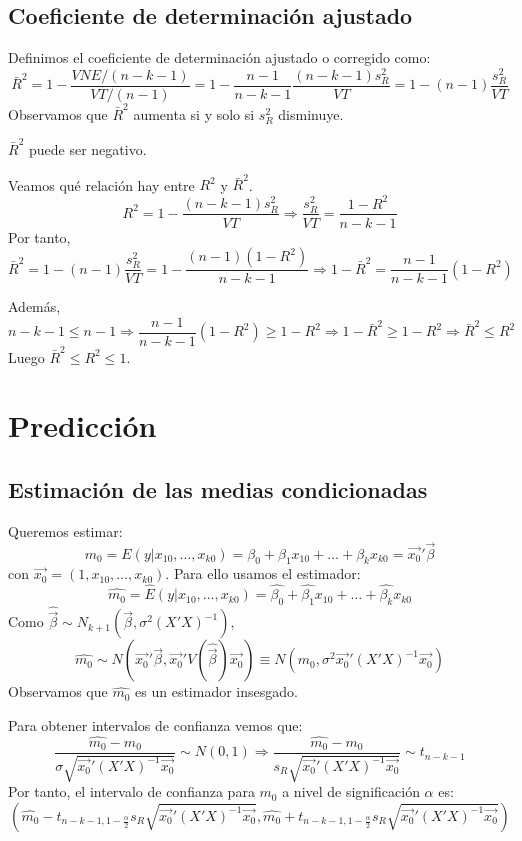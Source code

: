 \subsection*{Coeficiente de determinación ajustado}
Definimos el coeficiente de determinación ajustado o corregido como:
$$\bar{R}^2 = 1 - \frac{VNE/(n-k-1)}{VT/(n-1)} = 1 - \frac{n-1}{n-k-1}\frac{(n-k-1)s_R^2}{VT} = 1 - (n-1)\frac{s_R^2}{VT}$$
Observamos que $\bar{R}^2$ aumenta si y solo si $s_R^2$ disminuye.

\begin{note}
    $\bar{R}^2$ puede ser negativo.
\end{note}

Veamos qué relación hay entre $R^2$ y $\bar{R}^2$.
$$R^2 = 1 - \frac{(n-k-1)s_R^2}{VT} \Rightarrow \frac{s_R^2}{VT} = \frac{1-R^2}{n-k-1}$$
Por tanto,
$$\bar{R}^2 = 1 - (n-1)\frac{s_R^2}{VT} = 1 - \frac{(n-1)(1-R^2)}{n-k-1} \Rightarrow 1 - \bar{R}^2 = \frac{n-1}{n-k-1}(1 - R^2)$$

Además,
$$n-k-1 \leq n-1 \Rightarrow \frac{n-1}{n-k-1}(1-R^2) \geq 1 - R^2 \Rightarrow 1-\bar{R}^2 \geq 1-R^2 \Rightarrow \bar{R}^2 \leq R^2$$
Luego $\bar{R}^2 \leq R^2 \leq 1$.

\section{Predicción}
\subsection*{Estimación de las medias condicionadas}
Queremos estimar:
$$m_0 = E(y|x_{10}, \dots, x_{k0}) = \beta_0 + \beta_1x_{10} + \dots + \beta_kx_{k0} = \vec{x_0}'\vec{\beta}$$
con $\vec{x_0} = (1, x_{10}, \dots, x_{k0})$.
Para ello usamos el estimador:
$$\hat{m_0} = \hat{E}(y|x_{10}, \dots, x_{k0}) = \hat{\beta_0} + \hat{\beta_1}x_{10} + \dots + \hat{\beta_k}x_{k0}$$
Como $\hat{\vec{\beta}} \sim N_{k+1}(\vec{\beta}, \sigma^2(X'X)^{-1})$,
$$\hat{m_0} \sim N(\vec{x_0}'\vec{\beta}, \vec{x_0}'V(\hat{\vec{\beta}})\vec{x_0}) \equiv N(m_0, \sigma^2\vec{x_0}'(X'X)^{-1}\vec{x_0})$$
Observamos  que $\hat{m_0}$ es un estimador insesgado.

Para obtener intervalos de confianza vemos que:
$$\frac{\hat{m_0}-m_0}{\sigma\sqrt{\vec{x_0}'(X'X)^{-1}\vec{x_0}}} \sim N(0, 1) \Rightarrow \frac{\hat{m_0}-m_0}{s_R\sqrt{\vec{x_0}'(X'X)^{-1}\vec{x_0}}} \sim t_{n-k-1}$$
Por tanto, el intervalo de confianza para $m_0$ a nivel de significación $\alpha$ es:
$$\left( \hat{m_0} - t_{n-k-1, 1-\frac{\alpha}{2}} s_R\sqrt{\vec{x_0}'(X'X)^{-1}\vec{x_0}}, \hat{m_0} + t_{n-k-1, 1-\frac{\alpha}{2}} s_R\sqrt{\vec{x_0}'(X'X)^{-1}\vec{x_0}} \right)$$

